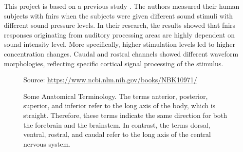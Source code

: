 This project is based on a previous study \citep{Weder2018}. The authors measured their human subjects with  \acrshort{fnirs} when the subjects were given different sound stimuli with different sound pressure levels. In their research, the results showed that  \acrshort{fnirs} responses originating from auditory processing areas are highly dependent on sound intensity level. More specifically, higher stimulation levels led to higher concentration changes. Caudal and rostral channels showed different waveform morphologies, reflecting specific cortical signal processing of the stimulus. 

\begin{figure}[h]
  \centering
           {Source: \url{https://www.ncbi.nlm.nih.gov/books/NBK10971/}}
   
  \caption{Some Anatomical Terminology. The terms anterior, posterior, superior, and inferior refer to the long axis of the body, which is straight. Therefore, these terms indicate the same direction for both the forebrain and the brainstem. In contrast, the terms dorsal, ventral, rostral, and caudal refer to the long axis of the central nervous system.}
\end{figure}



